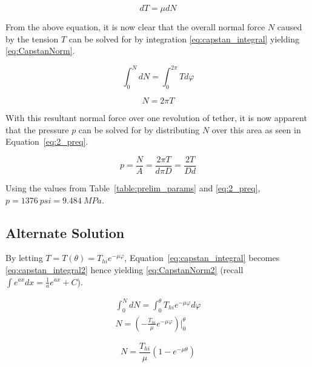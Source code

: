 \begin{equation}
	\label{eq:diffTens}
	dT = \mu dN
\end{equation}

From the above equation, it is now clear that the overall normal force $N$ caused by the tension $T$ can be solved for by integration \ref{eq:capstan_integral} yielding \ref{eq:CapstanNorm}.

\begin{equation}
	\label{eq:capstan_integral}
	\int_0^N dN =\int_0^{2\pi} T d\varphi
\end{equation}

\begin{equation}
	\label{eq:CapstanNorm}
	N=2\pi T	
\end{equation}

With this resultant normal force over one revolution of tether, it is now apparent that the pressure $p$ can be solved for by distributing $N$ over this area as seen in Equation~\ref{eq:2_preq}.

\begin{equation}
	\label{eq:2_preq}
	p=\frac{N}{A}=\frac{2\pi T}{d\pi D}=\frac{2T}{Dd}
\end{equation}

Using the values from Table~\ref{table:prelim_params} and \ref{eq:2_preq}, $p=1376\  psi= 9.484\  MPa$. 

\subsection{Alternate Solution}
\label{subsection:alt}
By letting $T = T(\theta)= T_{hi} e^{-\mu \varphi}$, Equation~\ref{eq:capstan_integral} becomes \ref{eq:capstan_integral2} hence yielding \ref{eq:CapstanNorm2} (recall $\int e^{ax} dx = \frac{1}{a} e^{ax} + C$).

\begin{equation}
	\label{eq:capstan_integral2}
	\begin{aligned}
		\int_0^N dN =\int_0^{\theta} T_{hi} e^{-\mu \varphi} d\varphi            \\
		N = \left( -\frac{T_{hi}}{\mu} e^{-\mu \varphi} \right) \Big|_0^{\theta} 
	\end{aligned}
\end{equation}

\begin{equation}
	\label{eq:CapstanNorm2}
	N = \frac{T_{hi}}{\mu} \left( 1 - e^{-\mu \theta} \right)
\end{equation}

